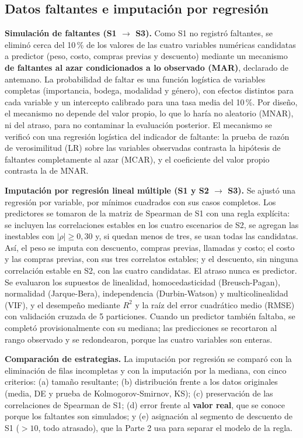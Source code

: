 \documentclass[11pt,a4paper]{article}
\begin{document}
\subsection{Datos faltantes e imputación por regresión}
\textbf{Simulación de faltantes (S1 $\to$ S3).} Como S1 no registró faltantes, se eliminó cerca del 10\,\% de los valores de las cuatro variables numéricas candidatas a predictor (peso, costo, compras previas y descuento) mediante un mecanismo \textbf{de faltantes al azar condicionados a lo observado (MAR)}, declarado de antemano. La probabilidad de faltar es una función logística de variables completas (importancia, bodega, modalidad y género), con efectos distintos para cada variable y un intercepto calibrado para una tasa media del 10\,\%. Por diseño, el mecanismo no depende del valor propio, lo que lo haría no aleatorio (MNAR), ni del atraso, para no contaminar la evaluación posterior. El mecanismo se verificó con una regresión logística del indicador de faltante: la prueba de razón de verosimilitud (LR) sobre las variables observadas contrasta la hipótesis de faltantes completamente al azar (MCAR), y el coeficiente del valor propio contrasta la de MNAR.

\textbf{Imputación por regresión lineal múltiple (S1 y S2 $\to$ S3).} Se ajustó una regresión por variable, por mínimos cuadrados con sus casos completos. Los predictores se tomaron de la matriz de Spearman de S1 con una regla explícita: se incluyen las correlaciones estables en los cuatro escenarios de S2, se agregan las inestables con $|\rho| \ge 0{,}30$ y, si quedan menos de tres, se usan todas las candidatas. Así, el peso se imputa con descuento, compras previas, llamadas y costo; el costo y las compras previas, con sus tres correlatos estables; y el descuento, sin ninguna correlación estable en S2, con las cuatro candidatas. El atraso nunca es predictor. Se evaluaron los supuestos de linealidad, homocedasticidad (Breusch-Pagan), normalidad (Jarque-Bera), independencia (Durbin-Watson) y multicolinealidad (VIF), y el desempeño mediante $R^2$ y la raíz del error cuadrático medio (RMSE) con validación cruzada de 5 particiones. Cuando un predictor también faltaba, se completó provisionalmente con su mediana; las predicciones se recortaron al rango observado y se redondearon, porque las cuatro variables son enteras.

\textbf{Comparación de estrategias.} La imputación por regresión se comparó con la eliminación de filas incompletas y con la imputación por la mediana, con cinco criterios: (a) tamaño resultante; (b) distribución frente a los datos originales (media, DE y prueba de Kolmogorov-Smirnov, KS); (c) preservación de las correlaciones de Spearman de S1; (d) error frente al \textbf{valor real}, que se conoce porque los faltantes son simulados; y (e) asignación al segmento de descuento de S1 ($> 10$, todo atrasado), que la Parte 2 usa para separar el modelo de la regla.
\end{document}
